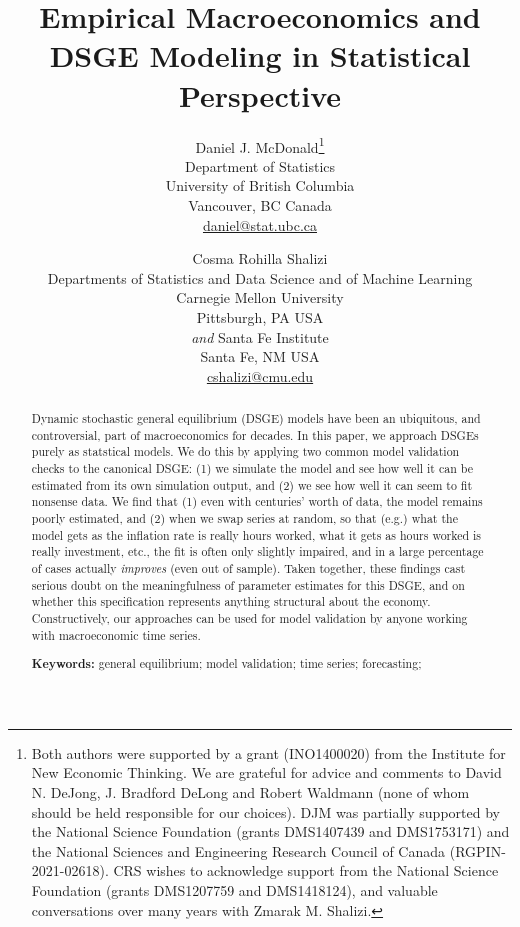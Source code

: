 \documentclass[11pt]{article}
\newcommand{\email}[1]{\href{mailto:#1}{#1}}
\begin{document}

\title{Empirical Macroeconomics and DSGE Modeling in Statistical
Perspective}
\author{  
    Daniel J. McDonald\thanks{Both authors were supported by a grant
(INO1400020) from the Institute for New Economic Thinking. We are
grateful for advice and comments to David N. DeJong, J. Bradford DeLong
and Robert Waldmann (none of whom should be held responsible for our
choices). DJM was partially supported by the National Science Foundation
(grants DMS1407439 and DMS1753171) and the National Sciences and
Engineering Research Council of Canada (RGPIN-2021-02618). CRS wishes to
acknowledge support from the National Science Foundation (grants
DMS1207759 and DMS1418124), and valuable conversations over many years
with Zmarak M. Shalizi.}  \\
  Department of Statistics\\
University of British Columbia\\
Vancouver, BC Canada\\
\email{daniel@stat.ubc.ca}  
   \and   Cosma Rohilla Shalizi \\
  Departments of Statistics and Data Science and of Machine Learning\\
Carnegie Mellon University\\
Pittsburgh, PA USA\\
\emph{and} Santa Fe Institute\\
Santa Fe, NM USA\\
\email{cshalizi@cmu.edu}  
  }
\date{}

\maketitle


\begin{abstract}
  Dynamic stochastic general equilibrium (DSGE) models have been an
ubiquitous, and controversial, part of macroeconomics for decades. In
this paper, we approach DSGEs purely as statstical models. We do this by
applying two common model validation checks to the canonical
\citet{SmetsWouters2007} DSGE: (1) we simulate the model and see how
well it can be estimated from its own simulation output, and (2) we see
how well it can seem to fit nonsense data. We find that (1) even with
centuries' worth of data, the model remains poorly estimated, and (2)
when we swap series at random, so that (e.g.) what the model gets as the
inflation rate is really hours worked, what it gets as hours worked is
really investment, etc., the fit is often only slightly impaired, and in
a large percentage of cases actually \emph{improves} (even out of
sample). Taken together, these findings cast serious doubt on the
meaningfulness of parameter estimates for this DSGE, and on whether this
specification represents anything structural about the economy.
Constructively, our approaches can be used for model validation by
anyone working with macroeconomic time series. 
  
  \vspace{11pt}
  \noindent\textbf{Keywords:} general equilibrium; model validation;
time series; forecasting;
\end{abstract}
\end{document}
